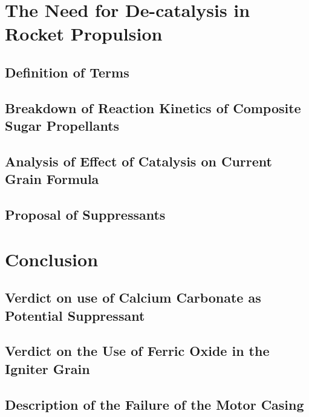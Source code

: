 \documentclass[12pt,letterpaper]{article}
\begin{document}
    \section{The Need for De-catalysis in Rocket Propulsion}
        \subsection{Definition of Terms}
            \lipsum[1]
            \subsection{Breakdown of Reaction Kinetics of Composite Sugar
			Propellants}
                    \lipsum[1-3]\cite{Ullmanns2006}
        \subsection{Analysis of Effect of Catalysis on Current Grain Formula}
            \lipsum[1]\cite{Brown_1964}
        \subsection{Proposal of Suppressants}

    \section{Conclusion}
        \subsection{Verdict on use of Calcium Carbonate as Potential Suppressant}
                \lipsum[1-3]
        \subsection{Verdict on the Use of Ferric Oxide in the Igniter Grain}
            \lipsum[1-2]
        \subsection{Description of the Failure of the Motor Casing}
            \lipsum[1-2]
\end{document}
